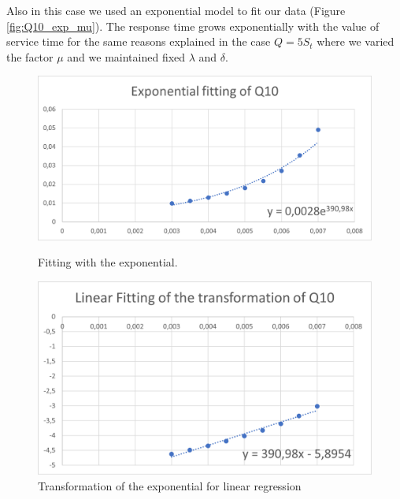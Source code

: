 \documentclass{article}
\begin{document}
                    Also in this case we used an exponential model to fit our data (Figure \ref{fig:Q10_exp_mu}). The response time grows exponentially with the value of service time for the same reasons explained in the case $Q = 5S_t$ where we varied the factor $\mu$ and we maintained fixed $\lambda$ and $\delta$.        
                    
                    \begin{figure}[htbp!]
                        \centering
                        \begin{minipage}[c]{.40\textwidth}
                            \centering
                            \includegraphics[width=\textwidth]{./data_analysis/Q10_exp_mu.png}
                            \caption{Fitting with the exponential.}
                            \label{fig:Q10_exp_mu}
                        \end{minipage}
                        \hspace{10mm}
                        \begin{minipage}[c]{.40\textwidth}
                            \centering
                            \includegraphics[width=\textwidth]{./data_analysis/Q10_lin_mu.png}
                            \caption{Transformation of the exponential for linear regression}
                            \label{fig:Q10_lin_mu}
                        \end{minipage}
                    \end{figure}
                    
\end{document}
